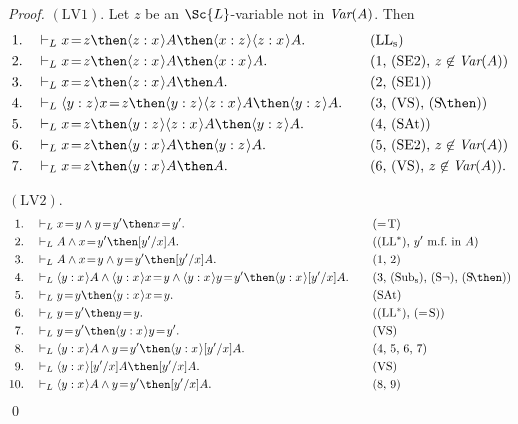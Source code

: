 \documentclass[11pt]{woarticle}
\theoremstyle{break}
\theoremstyle{nonumberplain}
\newcommand{\1}{\;\,|\;\,}
\newcommand{\var}{\emph{Var}}
\renewcommand{\t}[1]{\ensuremath{\langle #1  \makebox[.2ex]{}\rangle}}
\newcommand{\T}[1]{\ensuremath{(\mathrm{ #1})}}
\begin{document}
\begin{proof}
  \T{LV1}. Let $z$ be an $\Sc{L}$-variable not in $\var(A)$. Then
  \begin{alignat*}{2}
    1.\quad& \vdash_L x\!=\!z \then \t{z:x}A \then \t{x:z}\t{z:x}A.
    &\quad&\text{\T{LL_s}}\\
    2.\quad& \vdash_L x\!=\!z \then \t{z:x}A \then \t{x:x}A.
    &&\text{(1, \T{SE2}, $z \not\in \var(A)$)}\\
    3.\quad& \vdash_L x\!=\!z \then \t{z:x}A \then A.
    &&\text{(2, \T{SE1})}\\
    4.\quad& \vdash_L \t{y:z}x\!=\!z \then \t{y:z}\t{z:x}A \then \t{y:z}A.
    &&\text{(3, \T{VS}, \T{S\!\then})}\\
    5.\quad& \vdash_L x\!=\!z \then  \t{y:z}\t{z:x}A \then \t{y:z}A.
    &&\text{(4, \T{SAt})}\\
    6.\quad& \vdash_L x\!=\!z \then  \t{y:x}A \then \t{y:z}A.
    &&\text{(5, \T{SE2}, $z \not\in \var(A)$)}\\
    7.\quad& \vdash_L x\!=\!z \then  \t{y:x}A \then A.
    &&\text{(6, \T{VS}, $z \not\in \var(A)$)}. 
  \end{alignat*}

  \T{LV2}.
  \begin{alignat*}{2}
    1.\quad& \vdash_L x\!=\!y \land y\!=\!y' \then x\!=\!y'. 
    &\quad&\text{\T{=\!T}}\\
    2.\quad& \vdash_L A \land x\!=\!y' \then [y'/x]A.
    &\quad&\text{(\T{LL^*}, $y'$ m.f.\ in $A$)}\\
    3.\quad& \vdash_L A \land x\!=\!y \land y\!=\!y' \then [y'/x]A.
    &\quad&\text{(1, 2)}\\
    4.\quad& \vdash_L \t{y:x}A \land \t{y:x}x\!=\!y \land \t{y:x}y\!=\!y' \then \t{y:x}[y'/x]A.
    &\quad&\text{(3, \T{Sub_s}, \T{S\neg}, \T{S\!\then})}\\
    5.\quad& \vdash_L y\!=\!y \then \t{y:x}x\!=\!y.
    &\quad&\text{\T{SAt}}\\
    6.\quad& \vdash_L y\!=\!y' \then y\!=\!y.
    &\quad&\text{(\T{LL^*}, \T{=\!S})}\\
    7.\quad& \vdash_L y\!=\!y' \then \t{y:x}y\!=\!y'.
    &\quad&\text{\T{VS}}\\
    8.\quad& \vdash_L \t{y:x}A \land y\!=\!y' \then \t{y:x}[y'/x]A.
    &\quad&\text{(4, 5, 6, 7)}\\
    9.\quad& \vdash_L \t{y:x}[y'/x]A \then [y'/x]A.
    &\quad&\text{\T{VS}}\\
    10.\quad& \vdash_L \t{y:x}A \land y\!=\!y' \then [y'/x]A.
    &\quad&\text{(8, 9)}
  \end{alignat*}
  \qed
\end{proof}
\end{document}
